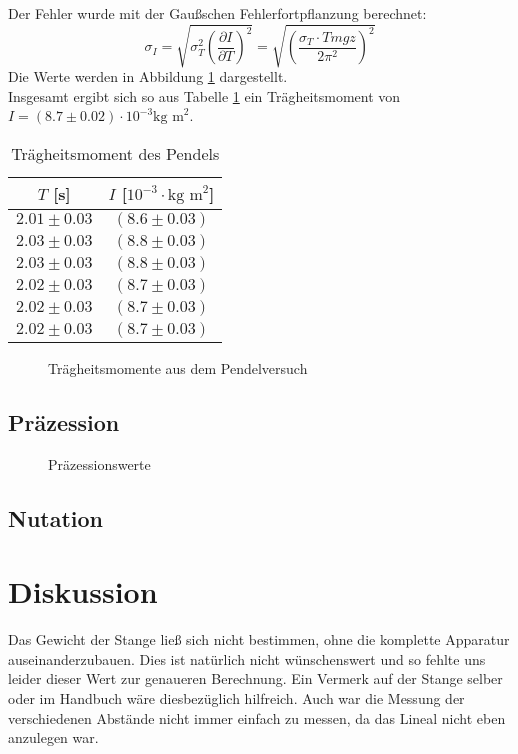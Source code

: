 \documentclass[12pt,a4paper,titlepage,headinclude,bibtotoc]{scrartcl}
\begin{document}
Der Fehler wurde mit der Gaußschen Fehlerfortpflanzung berechnet:
$$\sigma_I=\sqrt{\sigma_T^2\left(\dfrac{\partial I}{\partial T}\right)^2}=\sqrt{\left(\dfrac{\sigma_T\cdot Tmgz}{2\pi^2}\right)^2}$$
Die Werte werden in Abbildung \ref{img:pendeldaten} dargestellt.\\
Insgesamt ergibt sich so aus Tabelle \ref{tab:pendel} ein Trägheitsmoment von \(I=(8.7\pm 0.02)\cdot 10^{-3}\text{kg m}^2\).
\begin{table}[h!]
\centering
\begin{tabular}{|c|c|}
\hline 
$T$ [s] & $I$ [$10^{-3}\cdot \text{kg m}^2$] \\ 
\hline 
$2.01\pm 0.03$ & $(8.6\pm 0.03)$ \\ 
\hline 
$2.03\pm 0.03$ & $(8.8\pm 0.03)$\\ 
\hline
$2.03\pm 0.03$ & $(8.8\pm 0.03)$ \\ 
\hline 
$2.02\pm 0.03$ & $(8.7\pm 0.03)$ \\ 
\hline 
$2.02\pm 0.03$ & $(8.7\pm 0.03)$ \\ 
\hline 
$2.02\pm 0.03$ & $(8.7\pm 0.03)$ \\ 
\hline 
\end{tabular}
\caption{Trägheitsmoment des Pendels\label{tab:pendel}}
\end{table}
\begin{figure}
\centering

\caption{Trägheitsmomente aus dem Pendelversuch\label{img:pendeldaten}}
\end{figure}


\subsection{Präzession}
\begin{figure}[!htb]
\centering

\caption{Präzessionswerte}
\end{figure}

\subsection{Nutation}



\section{Diskussion}
\label{sec:diskussion}
Das Gewicht der Stange ließ sich nicht bestimmen, ohne die komplette Apparatur auseinanderzubauen.
Dies ist natürlich nicht wünschenswert und so fehlte uns leider dieser Wert zur genaueren Berechnung.
Ein Vermerk auf der Stange selber oder im Handbuch wäre diesbezüglich hilfreich.
Auch war die Messung der verschiedenen Abstände nicht immer einfach zu messen, da das Lineal nicht eben anzulegen war.
\end{document}
